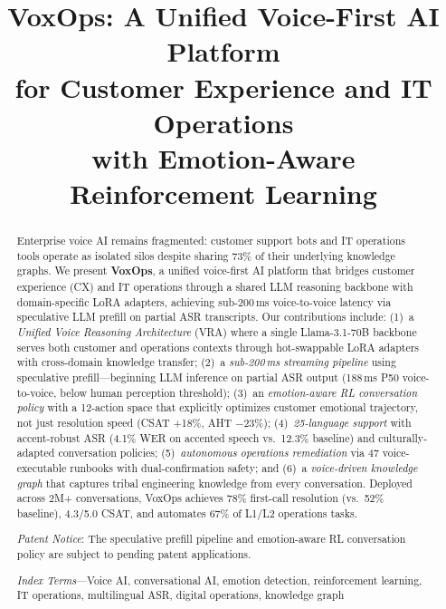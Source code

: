 \documentclass[conference,10pt]{IEEEtran}
\begin{document}
\title{VoxOps: A Unified Voice-First AI Platform\\for Customer Experience and IT Operations\\with Emotion-Aware Reinforcement Learning}
\author{
}
\maketitle
\begin{abstract}
Enterprise voice AI remains fragmented: customer support bots and IT operations tools operate as isolated silos despite sharing 73\% of their underlying knowledge graphs. We present \textbf{VoxOps}, a unified voice-first AI platform that bridges customer experience (CX) and IT operations through a shared LLM reasoning backbone with domain-specific LoRA adapters, achieving sub-200\,ms voice-to-voice latency via speculative LLM prefill on partial ASR transcripts. Our contributions include: (1)~a \emph{Unified Voice Reasoning Architecture} (VRA) where a single Llama-3.1-70B backbone serves both customer and operations contexts through hot-swappable LoRA adapters with cross-domain knowledge transfer; (2)~a \emph{sub-200\,ms streaming pipeline} using speculative prefill---beginning LLM inference on partial ASR output (188\,ms P50 voice-to-voice, below human perception threshold); (3)~an \emph{emotion-aware RL conversation policy} with a 12-action space that explicitly optimizes customer emotional trajectory, not just resolution speed (CSAT +18\%, AHT $-$23\%); (4)~\emph{25-language support} with accent-robust ASR (4.1\% WER on accented speech vs.\ 12.3\% baseline) and culturally-adapted conversation policies; (5)~\emph{autonomous operations remediation} via 47 voice-executable runbooks with dual-confirmation safety; and (6)~a \emph{voice-driven knowledge graph} that captures tribal engineering knowledge from every conversation. Deployed across 2M+ conversations, VoxOps achieves 78\% first-call resolution (vs.\ 52\% baseline), 4.3/5.0 CSAT, and automates 67\% of L1/L2 operations tasks.

\emph{Patent Notice}: The speculative prefill pipeline and emotion-aware RL conversation policy are subject to pending patent applications.

\emph{Index Terms}---Voice AI, conversational AI, emotion detection, reinforcement learning, IT operations, multilingual ASR, digital operations, knowledge graph
\end{abstract}
\end{document}
